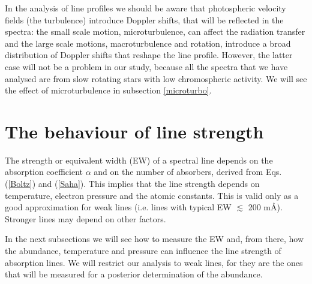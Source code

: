 \documentclass[dvips,12pt,a4paper]{report}
\begin{document}
{%




In the analysis of line profiles we should be aware that photospheric velocity fields (the turbulence) introduce Doppler shifts, that will be reflected in the spectra: the small scale motion, microturbulence, can affect the radiation transfer and the large scale motions, macroturbulence and rotation, introduce a broad distribution of Doppler shifts that reshape the line profile. However, the latter case will not be a problem in our study, because all the spectra that we have analysed are from slow rotating stars with low chromospheric activity. We will see the effect of microturbulence in subsection \ref{microturbo}.






\section{The behaviour of line strength}
\label{linestr}
The strength or equivalent width (EW) of a spectral line depends on the absorption coefficient $\alpha$ and on the number of absorbers, derived from Eqs. (\ref{Boltz}) and (\ref{Saha}). This implies that the line strength depends on temperature, electron pressure and the atomic constants. This is valid only as a good approximation for weak lines (i.e. lines with typical EW $\lesssim$ 200 m\AA). Stronger lines may depend on other factors. 

In the next subsections we will see how to measure the EW and, from there, how the abundance, temperature and pressure can influence the line strength of absorption lines. We will restrict our analysis to weak lines, for they are the ones that will be measured for a posterior determination of the abundance.

}
\end{document}
